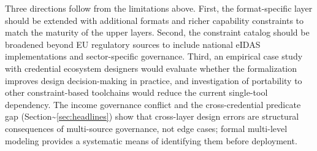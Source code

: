 Three directions follow from the limitations above. First, the format-specific layer should be extended with additional formats and richer capability constraints to match the maturity of the upper layers. Second, the constraint catalog should be broadened beyond EU regulatory sources to include national eIDAS implementations and sector-specific governance. Third, an empirical case study with credential ecosystem designers would evaluate whether the formalization improves design decision-making in practice, and investigation of portability to other constraint-based toolchains would reduce the current single-tool dependency. The income governance conflict and the cross-credential predicate gap (Section\textasciitilde{}\ref{sec:headlines}) show that cross-layer design errors are structural consequences of multi-source governance, not edge cases; formal multi-level modeling provides a systematic means of identifying them before deployment.
